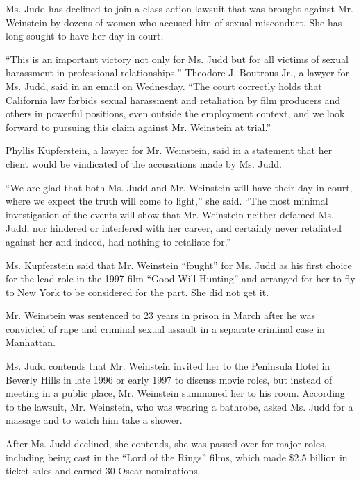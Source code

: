 Ms. Judd has declined to join a class-action lawsuit that was brought
against Mr. Weinstein by dozens of women who accused him of sexual
misconduct. She has long sought to have her day in court.

``This is an important victory not only for Ms. Judd but for all victims
of sexual harassment in professional relationships,'' Theodore J.
Boutrous Jr., a lawyer for Ms. Judd, said in an email on Wednesday.
``The court correctly holds that California law forbids sexual
harassment and retaliation by film producers and others in powerful
positions, even outside the employment context, and we look forward to
pursuing this claim against Mr. Weinstein at trial.''

Phyllis Kupferstein, a lawyer for Mr. Weinstein, said in a statement
that her client would be vindicated of the accusations made by Ms. Judd.

``We are glad that both Ms. Judd and Mr. Weinstein will have their day
in court, where we expect the truth will come to light,'' she said.
``The most minimal investigation of the events will show that Mr.
Weinstein neither defamed Ms. Judd, nor hindered or interfered with her
career, and certainly never retaliated against her and indeed, had
nothing to retaliate for.''

Ms. Kupferstein said that Mr. Weinstein ``fought'' for Ms. Judd as his
first choice for the lead role in the 1997 film ``Good Will Hunting''
and arranged for her to fly to New York to be considered for the part.
She did not get it.

Mr. Weinstein was
\href{https://www.nytimes.com/2020/03/11/nyregion/harvey-weinstein-sentencing.html}{sentenced
to 23 years in prison} in March after he was
\href{https://www.nytimes.com/2020/02/24/nyregion/harvey-weinstein-verdict.html}{convicted
of rape and criminal sexual assault} in a separate criminal case in
Manhattan.

Ms. Judd contends that Mr. Weinstein invited her to the Peninsula Hotel
in Beverly Hills in late 1996 or early 1997 to discuss movie roles, but
instead of meeting in a public place, Mr. Weinstein summoned her to his
room. According to the lawsuit, Mr. Weinstein, who was wearing a
bathrobe, asked Ms. Judd for a massage and to watch him take a shower.

After Ms. Judd declined, she contends, she was passed over for major
roles, including being cast in the ``Lord of the Rings'' films, which
made \$2.5 billion in ticket sales and earned 30 Oscar nominations.

